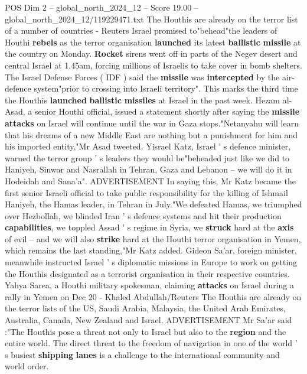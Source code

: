 \begin{textsample}{POS Dim 2 – global\_north\_2024\_12 – Score 19.00 – global\_north\_2024\_12/119229471.txt}  \label{ex:f2_pos_278}
The Houthis are already on the terror list of a number of countries - Reuters Israel promised to"behead"the leaders of Houthi \textbf{rebels} as the terror organisation \textbf{launched} its latest \textbf{ballistic} \textbf{missile} at the country on Monday. \textbf{Rocket} sirens went off in parts of the Negev desert and central Israel at 1.45am, forcing millions of Israelis to take cover in bomb shelters.
The Israel Defense Forces ( IDF ) said the \textbf{missile} was \textbf{intercepted} by the air-defence system"prior to crossing into Israeli territory".
This marks the third time the Houthis \textbf{launched} \textbf{ballistic} \textbf{missiles} at Israel in the past week.
Hezam al-Asad, a senior Houthi official, issued a statement shortly after saying the \textbf{missile} \textbf{attacks} on Israel will continue until the war in Gaza stops."Netanyahu will learn that his dreams of a new Middle East are nothing but a punishment for him and his imported entity,"Mr Asad tweeted.
Yisrael Katz, Israel ' s defence minister, warned the terror group ' s leaders they would be"beheaded just like we did to Haniyeh, Sinwar and Nasrallah in Tehran, Gaza and Lebanon -- we will do it in Hodeidah and Sana'a".
ADVERTISEMENT In saying this, Mr Katz became the first senior Israeli official to take public responsibility for the killing of Ishmail Haniyeh, the Hamas leader, in Tehran in July."We defeated Hamas, we triumphed over Hezbollah, we blinded Iran ' s defence systems and hit their production \textbf{capabilities}, we toppled Assad ' s regime in Syria, we \textbf{struck} hard at the \textbf{axis} of evil -- and we will also \textbf{strike} hard at the Houthi terror organisation in Yemen, which remains the last standing,"Mr Katz added.
Gideon Sa'ar, foreign minister, meanwhile instructed Israel ' s diplomatic missions in Europe to work on getting the Houthis designated as a terrorist organisation in their respective countries.
Yahya Sarea, a Houthi military spokesman, claiming \textbf{attacks} on Israel during a rally in Yemen on Dec 20 - Khaled Abdullah/Reuters The Houthis are already on the terror lists of the US, Saudi Arabia, Malaysia, the United Arab Emirates, Australia, Canada, New Zealand and Israel.
ADVERTISEMENT Mr Sa'ar said :"The Houthis pose a threat not only to Israel but also to the \textbf{region} and the entire world.
The direct threat to the freedom of navigation in one of the world ' s busiest \textbf{shipping} \textbf{lanes} is a challenge to the international community and world order.

\end{textsample}
